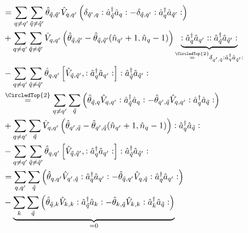 \begin{appendix}
\begin{itemize}
\begin{align}
&=\Sum_{q\neq q^\prime}\Sum_{\tilde q\neq\tilde q^\prime} \hat\theta_{\tilde q,\tilde q^\prime}\hat V_{q,q^\prime}\left(\delta_{\tilde q^\prime,q}\NO\CR_{\tilde q}\AN_q\NO-\delta_{\tilde q,q^\prime}\NO\CR_q\AN_{\tilde q^\prime}\NO\right) \\
&+\Sum_{q\neq q^\prime}\Sum_{\tilde q\neq\tilde q^\prime} \hat V_{q,q^\prime}\left(\hat\theta_{\tilde q,\tilde q^\prime}-\hat\theta_{\tilde q,\tilde q^\prime}(\hat n_{q^\prime}+1,\hat n_q-1)\right)\underbrace{\NO\CR_q\AN_{q^\prime}\NO\NO\CR_{\tilde q}\AN_{\tilde q^\prime}\NO}_{\overset{\CircledTop{2}}{=}\delta_{q^\prime,\tilde q}\NO\CR_{q}\AN_{\tilde q^\prime}\NO}\nonumber \\
&-\Sum_{q\neq q^\prime}\Sum_{\tilde q\neq\tilde q^\prime} \hat\theta_{q,q^\prime}\left[\hat V_{\tilde q,\tilde q^\prime},\NO\CR_q\AN_{q^\prime}\NO\right]\NO\CR_{\tilde q}\AN_{\tilde q^\prime}\NO\nonumber \\
&\overset{\CircledTop{2}}{=}\Sum_{q\neq q^\prime}\Sum_{\tilde q} \left(\hat\theta_{\tilde q,q}\hat V_{q,q^\prime}\NO\CR_{\tilde q}\AN_q\NO-\hat\theta_{q^\prime,\tilde q}\hat V_{q,q^\prime}\NO\CR_{q}\AN_{\tilde q}\NO\right) \nonumber \\
&+\Sum_{q\neq q^\prime}\Sum_{\tilde q} \hat V_{q,q^\prime}\left(\hat\theta_{q^\prime,\tilde q}-\hat\theta_{q^\prime,\tilde q}(\hat n_{q^\prime}+1,\hat n_q-1)\right)\NO\CR_{q}\AN_{\tilde q}\NO\nonumber \\
&-\Sum_{q\neq q^\prime}\Sum_{\tilde q\neq\tilde q^\prime} \hat\theta_{q,q^\prime}\left[\hat V_{\tilde q,\tilde q^\prime},\NO\CR_q\AN_{q^\prime}\NO\right]\NO\CR_{\tilde q}\AN_{\tilde q^\prime}\NO\nonumber \\
&=\Sum_{q, q^\prime}\Sum_{\tilde q} \left(\hat\theta_{q,q^\prime}\hat V_{q^\prime,\tilde q}\NO\CR_{q}\AN_{q^\prime}\NO-\hat\theta_{\tilde q,q^\prime}\hat V_{q,\tilde q}\NO\CR_{q}\AN_{q^\prime}\NO\right) \\
&-\underbrace{\Sum_{k}\Sum_{\tilde q} \left(\hat\theta_{\tilde q,k}\hat V_{k,k}\NO\CR_{\tilde q}\AN_k\NO-\hat\theta_{k,\tilde q}\hat V_{k,k}\NO\CR_{k}\AN_{\tilde q}\NO\right)}_{=0} \nonumber \\

\end{align}
\end{itemize}
\end{appendix}
